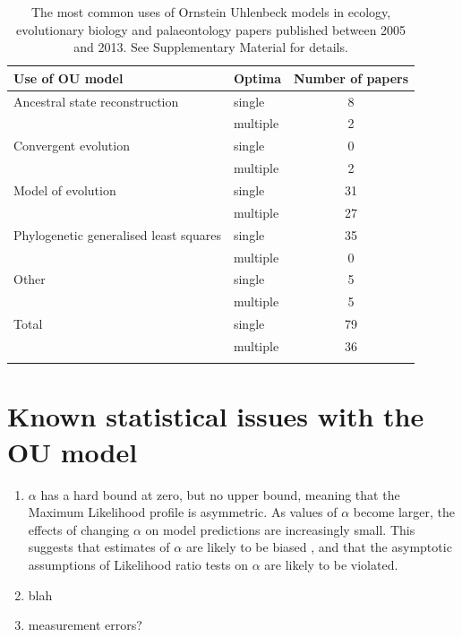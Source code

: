 \documentclass[a4paper,12pt]{article}
\begin{document}
    \begin{table}[h]
      \begin{center}
        \caption{The most common uses of Ornstein Uhlenbeck models in ecology, evolutionary biology and palaeontology papers published between 2005 and 2013. See Supplementary Material for details.}
        \bigskip  
          \begin{tabular}{p{8cm}lc}
            \hline
            Use of OU model & Optima & Number of papers\\
            \hline
            Ancestral state reconstruction & single & 8\\
            & multiple & 2\\
            Convergent evolution & single & 0\\
            & multiple & 2\\
            Model of evolution & single & 31\\
            & multiple & 27\\
            Phylogenetic generalised least squares & single & 35\\
            & multiple & 0\\
            Other & single & 5\\
            & multiple & 5\\
            Total & single &  79\\
            & multiple & 36\\
            \hline
            \label{table.uses}
          \end{tabular}
      \end{center}
    \end{table}

\section{Known statistical issues with the OU model}

    \begin{enumerate}
      \item $\alpha$ has a hard bound at zero, but no upper bound, meaning that the Maximum Likelihood profile is asymmetric. As values of $\alpha$ become larger, the effects of changing $\alpha$ on model predictions are increasingly small. This suggests that estimates of $\alpha$ are likely to be biased
      , and that the asymptotic assumptions of Likelihood ratio tests on $\alpha$ are likely to be violated.
      \item blah
      \item measurement errors?
    \end{enumerate}
\end{document}
